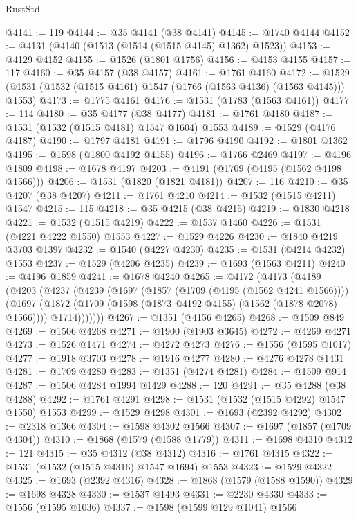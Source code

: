 \begin{lexlean}{RustStd}
\begin{coremodule}
@4141 := 119
@4144 := @35 @4141 (@38 @4141)
@4145 := @1740 @4144
@4152 := @4131 (@4140 (@1513 (@1514 (@1515 @4145) @1362) @1523))
@4153 := @4129 @4152
@4155 := @1526 (@1801 @1756)
@4156 := @4153 @4155
@4157 := 117
@4160 := @35 @4157 (@38 @4157)
@4161 := @1761 @4160
@4172 := @1529 (@1531 (@1532 (@1515 @4161) @1547 (@1766 (@1563 @4136) (@1563 @4145))) @1553)
@4173 := @1775 @4161
@4176 := @1531 (@1783 (@1563 @4161))
@4177 := 114
@4180 := @35 @4177 (@38 @4177)
@4181 := @1761 @4180
@4187 := @1531 (@1532 (@1515 @4181) @1547 @1604) @1553
@4189 := @1529 (@4176 @4187)
@4190 := @1797 @4181
@4191 := @1796 @4190
@4192 := @1801 @1362
@4195 := @1598 (@1800 @4192 @4155)
@4196 := @1766 @2469
@4197 := @4196 @1809
@4198 := @1678 @4197
@4203 := @4191 (@1709 (@4195 (@1562 @4198 @1566)))
@4206 := @1531 (@1820 (@1821 @4181))
@4207 := 116
@4210 := @35 @4207 (@38 @4207)
@4211 := @1761 @4210
@4214 := @1532 (@1515 @4211) @1547
@4215 := 115
@4218 := @35 @4215 (@38 @4215)
@4219 := @1830 @4218
@4221 := @1532 (@1515 @4219)
@4222 := @1537 @1460
@4226 := @1531 (@4221 @4222 @1550) @1553
@4227 := @1529 @4226
@4230 := @1840 @4219 @3703 @1397
@4232 := @1540 (@4227 @4230)
@4235 := @1531 (@4214 @4232) @1553
@4237 := @1529 (@4206 @4235)
@4239 := @1693 (@1563 @4211)
@4240 := @4196 @1859
@4241 := @1678 @4240
@4265 := @4172
    (@4173
      (@4189
        (@4203
          (@4237
            (@4239
              (@1697
                (@1857 (@1709 (@4195 (@1562 @4241 @1566))))
                (@1697
                  (@1872 (@1709 (@1598 (@1873 @4192 @4155) (@1562 (@1878 @2078) @1566))))
                  @1714)))))))
@4267 := @1351 (@4156 @4265)
@4268 := @1509 @849
@4269 := @1506 @4268
@4271 := @1900 (@1903 @3645)
@4272 := @4269 @4271
@4273 := @1526 @1471
@4274 := @4272 @4273
@4276 := @1556 (@1595 @1017)
@4277 := @1918 @3703
@4278 := @1916 @4277
@4280 := @4276 @4278 @1431
@4281 := @1709 @4280
@4283 := @1351 (@4274 @4281)
@4284 := @1509 @914
@4287 := @1506 @4284 @1994 @1429
@4288 := 120
@4291 := @35 @4288 (@38 @4288)
@4292 := @1761 @4291
@4298 := @1531 (@1532 (@1515 @4292) @1547 @1550) @1553
@4299 := @1529 @4298
@4301 := @1693 (@2392 @4292)
@4302 := @2318 @1366
@4304 := @1598 @4302 @1566
@4307 := @1697 (@1857 (@1709 @4304))
@4310 := @1868 (@1579 (@1588 @1779))
@4311 := @1698 @4310
@4312 := 121
@4315 := @35 @4312 (@38 @4312)
@4316 := @1761 @4315
@4322 := @1531 (@1532 (@1515 @4316) @1547 @1694) @1553
@4323 := @1529 @4322
@4325 := @1693 (@2392 @4316)
@4328 := @1868 (@1579 (@1588 @1590))
@4329 := @1698 @4328
@4330 := @1537 @1493
@4331 := @2230 @4330
@4333 := @1556 (@1595 @1036)
@4337 := @1598 (@1599 @129 @1041) @1566

\end{coremodule}
\end{lexlean}
